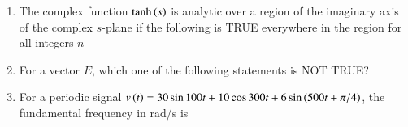 \documentclass[journal,12pt,onecolumn]{IEEEtran}
\theoremstyle{remark}
\begin{document}
\begin{enumerate}
\item The complex function $\tanh \left(s\right)$ is analytic over a region of the imaginary axis of the complex $s$-plane if the following is TRUE everywhere in the region for all integers $n$
\par \hfill{}
    \begin{enumerate}
    \end{enumerate}

\item For a vector $E$, which one of the following statements is NOT TRUE?
\par \hfill{}
    \begin{enumerate}
    \end{enumerate}

\item For a periodic signal $v\left(t\right) = 30 \sin 100 t + 10 \cos 300 t + 6 \sin\left(500 t + \pi/4\right)$, the fundamental frequency in rad/s is
\par \hfill{}
    \begin{enumerate}
    \end{enumerate}


\end{enumerate}
\end{document}
